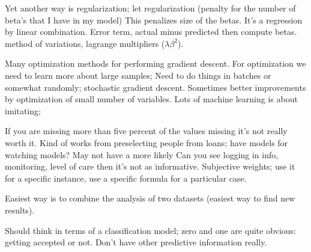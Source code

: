 Yet another way is regularization; let regularization (penalty for
the number of beta's that I have in my model) This penalizes size
of the betas.
It's a regression by linear combination.
Error term, actual minus predicted then compute betas.
method of variations, lagrange multipliers ($\lambda \beta^2$).

Many optimization methods for performing gradient descent.
For optimization we need to learn more about large samples;
Need to do things in batches or somewhat randomly; stochastic
gradient descent. Sometimes better improvements by optimization
of small number of variables.
Lots of machine learning is about imitating;

If you are missing more than five percent of the values
missing it's not really worth it.
Kind of works from preselecting people from loans;
have models for watching models?
May not have a more likely
Can you see logging in info, monitoring, level of care
then it's not as informative.
Subjective weights; use it for a specific instance, use
a specific formula for a particular case.

Easiest way is to combine the analysis of 
two datasets (easiest way to find new results).

Should think in terms of a classification model;
zero and one are quite obvious: getting accepted
or not. Don't have other predictive information really.
